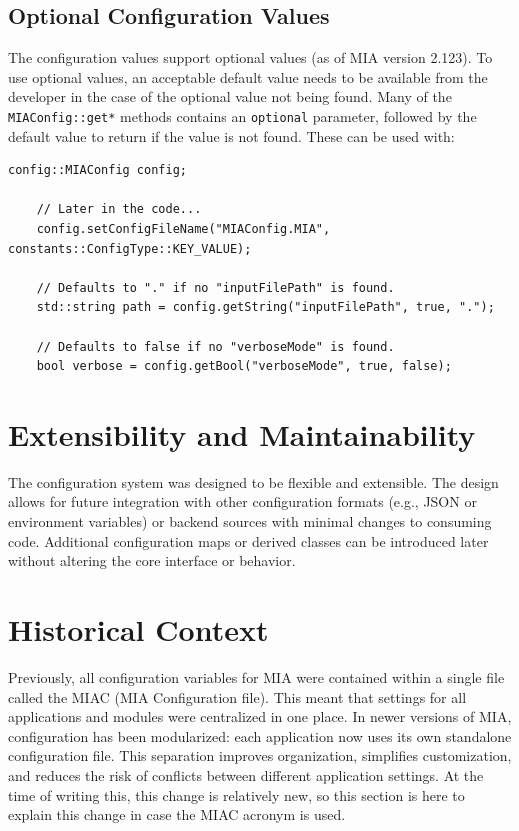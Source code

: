 \subsection*{Optional Configuration Values}

The configuration values support optional values (as of MIA version 2.123). To use optional values, an acceptable default value needs to be available from the developer in the case of the optional value not being found. Many of the \texttt{MIAConfig::get*} methods contains an \texttt{optional} parameter, followed by the default value to return if the value is not found. These can be used with:

\begin{lstlisting}[style=cppstyle]
	config::MIAConfig config;

	// Later in the code...
	config.setConfigFileName("MIAConfig.MIA", constants::ConfigType::KEY_VALUE);

	// Defaults to "." if no "inputFilePath" is found.
	std::string path = config.getString("inputFilePath", true, ".");

	// Defaults to false if no "verboseMode" is found.
	bool verbose = config.getBool("verboseMode", true, false);
\end{lstlisting}

\section{Extensibility and Maintainability}

The configuration system was designed to be flexible and extensible. The design allows for future integration with other configuration formats (e.g., JSON or environment variables) or backend sources with minimal changes to consuming code. Additional configuration maps or derived classes can be introduced later without altering the core interface or behavior.

\section{Historical Context}

Previously, all configuration variables for MIA were contained within a single file called the MIAC (MIA Configuration file). This meant that settings for all applications and modules were centralized in one place. In newer versions of MIA, configuration has been modularized: each application now uses its own standalone configuration file. This separation improves organization, simplifies customization, and reduces the risk of conflicts between different application settings. At the time of writing this, this change is relatively new, so this section is here to explain this change in case the MIAC acronym is used.
